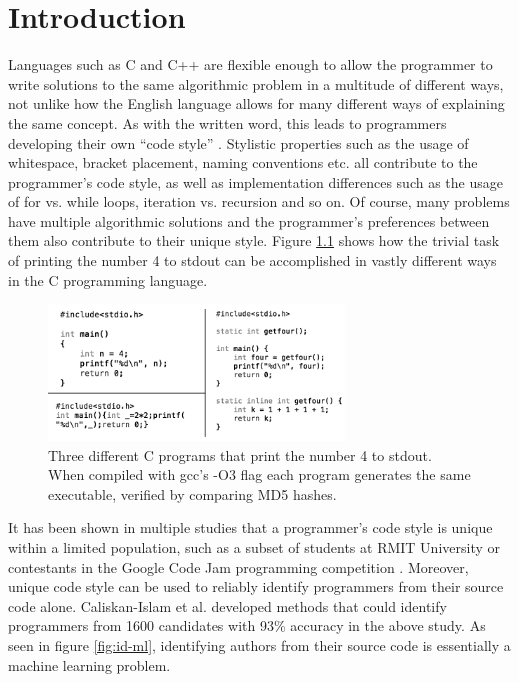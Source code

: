 \documentclass[a4paper,11pt]{kth-mag}
\begin{document}
\chapter{Introduction}
Languages such as C and C++ are flexible enough to allow the programmer to
write solutions to the same algorithmic problem in a multitude of different
ways, not unlike how the English language allows for many different ways of
explaining the same concept. As with the written word, this leads to
programmers developing their own ``code style''
\parencite{krsul1997authorship}. Stylistic properties such as the usage of
whitespace, bracket placement, naming conventions etc. all contribute to the
programmer's code style, as well as implementation differences such as the
usage of for vs. while loops, iteration vs. recursion and so on. Of course,
many problems have multiple algorithmic solutions and the programmer's
preferences between them also contribute to their unique style. Figure
\ref{fig:3x4} shows how the trivial task of printing the number 4 to stdout can
be accomplished in vastly different ways in the C programming language.


\begin{figure}[!htb]
    \centering
    \includegraphics[width=0.7\textwidth]{3x4}
    \caption{Three different C programs that print the number 4 to stdout. When
    compiled with gcc's -O3 flag each program generates the same executable,
    verified by comparing MD5 hashes.}
    \label{fig:3x4}
\end{figure}

It has been shown in multiple studies that a programmer's code style is unique
within a limited population, such as a subset of students at RMIT University
\parencite{burrows2009application} or contestants in the Google Code Jam
programming competition \parencite{caliskan2015anonymizing}. Moreover, unique
code style can be used to reliably identify programmers from their source code
alone.  Caliskan-Islam et al. developed methods that could identify programmers
from 1600 candidates with 93\% accuracy in the above study. As seen in figure
\ref{fig:id-ml}, identifying authors from their source code is essentially a
machine learning problem.
\end{document}
